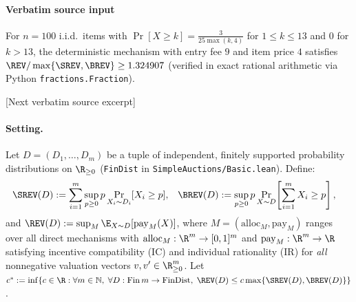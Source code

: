\documentclass[10pt]{article}
\begin{document}
\paragraph{Verbatim source input}
\begin{ReviewVerbatim}
\begin{proposition}\label{prop:iid100}
For $n = 100$ i.i.d.\ items with $\Pr[X \ge k] = \frac{3}{25 \max(k,4)}$ for $1 \le k \le 13$ and $0$ for $k > 13$, the deterministic mechanism with entry fee $9$ and item price $4$ satisfies $\REV / \max\{\SREV, \BREV\} \ge 1.324907$ (verified in exact rational arithmetic via Python \texttt{fractions.Fraction}).
\end{proposition}

[Next verbatim source excerpt]

\paragraph{Setting.}
Let $D = (D_1, \dots, D_m)$ be a tuple of independent, finitely supported probability distributions on $\R_{\ge 0}$ (\texttt{FinDist} in \texttt{SimpleAuctions/Basic.lean}). Define:
\begin{align*}
  \SREV(D) &:= \sum_{i=1}^m \sup_{p \ge 0} p \Pr_{X_i \sim D_i}[X_i \ge p], &
  \BREV(D) &:= \sup_{p \ge 0} p \Pr_{X \sim D}\!\left[\sum_{i=1}^m X_i \ge p\right],
\end{align*}
and $\REV(D) := \sup_{M} \E_{X \sim D}[\mathrm{pay}_M(X)]$, where $M = (\mathrm{alloc}_M, \mathrm{pay}_M)$ ranges over all direct mechanisms with $\mathrm{alloc}_M : \R^m \to [0,1]^m$ and $\mathrm{pay}_M : \R^m \to \R$ satisfying incentive compatibility (IC) and individual rationality (IR) for \emph{all} nonnegative valuation vectors $v, v' \in \R_{\ge 0}^m$. Let $c^* := \inf\{c \in \R : \forall m \in \mathbb{N},\; \forall D : \mathrm{Fin}\,m \to \mathrm{FinDist},\; \REV(D) \le c \max\{\SREV(D),\BREV(D)\}\}$.
\end{ReviewVerbatim}
\end{document}
